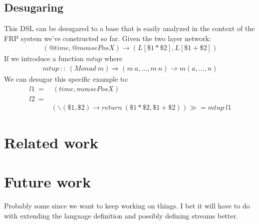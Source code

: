 \documentclass[twocolumn,11pt,english]{article}
\begin{document}
\subsection{Desugaring}
This DSL can be desugared to a base that is easily analyzed in the context of the FRP system we've constructed so far. Given the two layer network:
\small
\begin{align*}
(@time, @mousePosX) \rightarrow (L[\$1 * \$2], L[\$1 + \$2])
\end{align*}
\normalsize
If we introduce a function $mtup$ where 
\small
\begin{align*}
mtup~::~(Monad~m) \Rightarrow (m~a, ..., m~n) \rightarrow m (a, ..., n)
\end{align*}
\normalsize
We can desugar this specific example to:
\small
\begin{align*}
l1~=&~(time, mousePosX)
\\l2~=&
\\&(\backslash (\$1, \$2) \rightarrow return~ (\$1 * \$2, \$1 + \$2)) \gg = mtup~l1
\end{align*}
\normalsize
\section{Related work}


\section{Future work}
Probably some since we want to keep working on things. I bet it will have to do with extending the language definition and possibly defining streams better.




\end{document}
